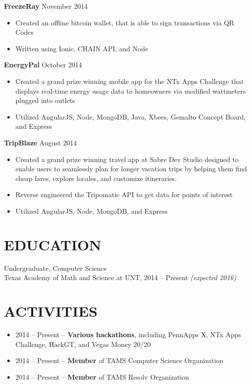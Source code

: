 \documentclass[margin, 10pt]{res} %
\begin{document}
\begin{resume}
  \textbf{FreezeRay} \hfill November 2014

  \begin{itemize} \itemsep -2pt
    \item Created an offline bitcoin wallet, that is able to sign transactions via QR Codes
    \item Written using Ionic, CHAIN API, and Node
  \end{itemize}

  \textbf{EnergyPal} \hfill October 2014

  \begin{itemize} \itemsep -2pt
    \item Created a grand prize winning mobile app for the NTx Apps Challenge that displays real-time energy usage data to homeowners via modified wattmeters plugged into outlets
    \item Utilized AngularJS, Node, MongoDB, Java, Xbees, Gemalto Concept Board, and Express
  \end{itemize}

  \textbf{TripBlaze} \hfill August 2014

  \begin{itemize} \itemsep -2pt
    \item Created a grand prize winning travel app at Sabre Dev Studio designed to enable users to seamlessly plan for longer vacation trips by helping them find cheap fares, explore locales, and customize itineraries. 
    \item Reverse engineered the Tripomatic API to get data for points of interest
    \item Utilized AngularJS, Node, MongoDB, and Express
  \end{itemize}
  
  \section{EDUCATION}

  Undergraduate, Computer Science \\
  Texas Academy of Math and Science at UNT, 2014 -- Present \textit {(expected 2016)} \\

  \section{ACTIVITIES} 

  \begin{itemize} \itemsep -2pt
    \item 2014 -- Present -- \textbf{Various hackathons}, including PennApps X, NTx Apps Challenge, HackGT, and Vegas Money 20/20 
    \item 2014 -- Present -- \textbf{Member} of TAMS Computer Science Organization
    \item 2014 -- Present -- \textbf{Member} of TAMS Resolv Organization
  \end{itemize}
\end{resume}
\end{document}
